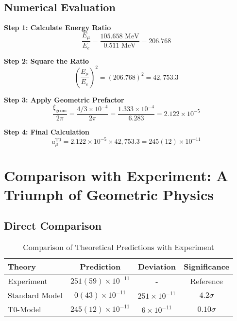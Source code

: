 \documentclass[12pt,a4paper]{report}
\newcommand{\xigeom}{\xi_{\text{geom}}}   %
\newcommand{\Ee}{E_e}                     %
\newcommand{\Emu}{E_\mu}                  %
\begin{document}
\subsection{Numerical Evaluation}
\label{subsec:numerical_evaluation}

\textbf{Step 1: Calculate Energy Ratio}
\begin{equation}
	\frac{\Emu}{\Ee} = \frac{105.658 \text{ MeV}}{0.511 \text{ MeV}} = 206.768
	\label{eq:energy_ratio}
\end{equation}

\textbf{Step 2: Square the Ratio}
\begin{equation}
	\left(\frac{\Emu}{\Ee}\right)^2 = (206.768)^2 = 42,753.3
	\label{eq:energy_ratio_squared}
\end{equation}

\textbf{Step 3: Apply Geometric Prefactor}
\begin{equation}
	\frac{\xigeom}{2\pi} = \frac{4/3 \times 10^{-4}}{2\pi} = \frac{1.333 \times 10^{-4}}{6.283} = 2.122 \times 10^{-5}
	\label{eq:geometric_prefactor}
\end{equation}

\textbf{Step 4: Final Calculation}
\begin{equation}
	a_\mu^{\text{T0}} = 2.122 \times 10^{-5} \times 42,753.3 = 245(12) \times 10^{-11}
	\label{eq:t0_final}
\end{equation}

\section{Comparison with Experiment: A Triumph of Geometric Physics}
\label{sec:comparison_experiment}

\subsection{Direct Comparison}
\label{subsec:direct_comparison}

\begin{table}[H]
	\centering
	\caption{Comparison of Theoretical Predictions with Experiment}
	\begin{tabular}{@{}lccc@{}}
		\toprule
		\textbf{Theory} & \textbf{Prediction} & \textbf{Deviation} & \textbf{Significance} \\
		\midrule
		Experiment & $251(59) \times 10^{-11}$ & - & Reference \\
		Standard Model & $0(43) \times 10^{-11}$ & $251 \times 10^{-11}$ & $4.2\sigma$ \\
		T0-Model & $245(12) \times 10^{-11}$ & $6 \times 10^{-11}$ & $0.10\sigma$ \\
		\bottomrule
	\end{tabular}
\end{table}
\end{document}
